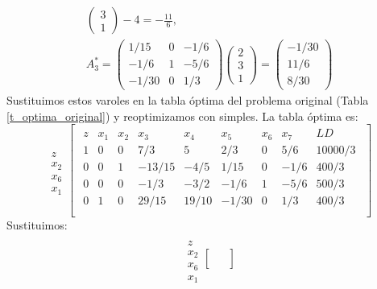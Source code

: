 \documentclass[11pt,letterpaper]{article}
\begin{document}
\begin{enumerate}
\begin{align*}
\begin{pmatrix}
3\\
1
\end{pmatrix}-4=-\frac{11}{6},\\
A^*_3 = \begin{pmatrix}
1/15 & 0 & -1/6\\
-1/6 & 1 & -5/6\\
-1/30 & 0 & 1/3
\end{pmatrix}\begin{pmatrix}
2\\
3\\
1
\end{pmatrix}=\begin{pmatrix}
-1/30\\
11/6\\
8/30
\end{pmatrix}
\end{align*}
Sustituimos estos varoles en la tabla óptima del problema original (Tabla \ref{t_optima_original}) y reoptimizamos con simples. La tabla óptima es:
\begin{equation} 
\begin{array}{c}
\\
z \\ 
x_2 \\
x_6 \\
x_1
\end{array}
\begin{bmatrix}
\begin{array}{c||cccccccc}
  z & x_1 & x_2 & x_3 & x_4 & x_5 & x_6 & x_7 & LD\\ \hline \hline
  1 & 0 & 0 & 7/3 & 5 & 2/3 & 0 & 5/6 & 10000/3\\ 
  0 & 0 & 1 &-13/15 & -4/5 & 1/15 & 0 &-1/6 & 400/3  \\
  0 & 0 & 0 &-1/3 & -3/2 & -1/6 & 1 & -5/6& 500/3 \\
  0 & 1 & 0 & 29/15 & 19/10 & -1/30 & 0 & 1/3 & 400/3 \\
\end{array}
\end{bmatrix}
\end{equation}
Sustituimos:
\begin{equation} 
\begin{array}{c}
\\
z \\ 
x_2 \\
x_6 \\
x_1
\end{array}
\begin{bmatrix}
\begin{array}{c||cccccccc}

\end{array}
\end{bmatrix}
\end{equation}
\end{enumerate}
\end{document}
